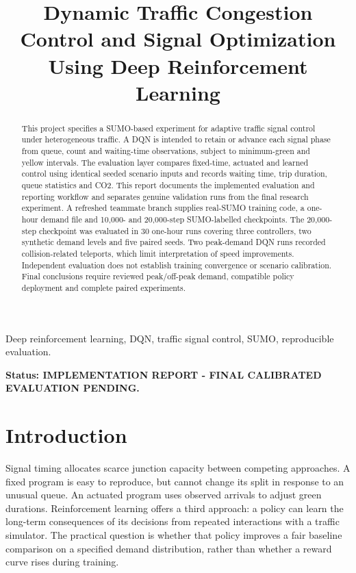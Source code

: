 \documentclass[conference]{IEEEtran}
\begin{document}
\title{Dynamic Traffic Congestion Control and Signal Optimization Using Deep Reinforcement Learning}
\author{}
\maketitle
\begin{abstract}This project specifies a SUMO-based experiment for adaptive traffic signal control under heterogeneous traffic. A DQN is intended to retain or advance each signal phase from queue, count and waiting-time observations, subject to minimum-green and yellow intervals. The evaluation layer compares fixed-time, actuated and learned control using identical seeded scenario inputs and records waiting time, trip duration, queue statistics and CO2. This report documents the implemented evaluation and reporting workflow and separates genuine validation runs from the final research experiment. A refreshed teammate branch supplies real-SUMO training code, a one-hour demand file and 10,000- and 20,000-step SUMO-labelled checkpoints. The 20,000-step checkpoint was evaluated in 30 one-hour runs covering three controllers, two synthetic demand levels and five paired seeds. Two peak-demand DQN runs recorded collision-related teleports, which limit interpretation of speed improvements. Independent evaluation does not establish training convergence or scenario calibration. Final conclusions require reviewed peak/off-peak demand, compatible policy deployment and complete paired experiments.\end{abstract}
\begin{IEEEkeywords}Deep reinforcement learning, DQN, traffic signal control, SUMO, reproducible evaluation.\end{IEEEkeywords}
\noindent\textbf{Status: IMPLEMENTATION REPORT - FINAL CALIBRATED EVALUATION PENDING.}
\section{Introduction}
Signal timing allocates scarce junction capacity between competing approaches. A fixed program is easy to reproduce, but cannot change its split in response to an unusual queue. An actuated program uses observed arrivals to adjust green durations. Reinforcement learning offers a third approach: a policy can learn the long-term consequences of its decisions from repeated interactions with a traffic simulator. The practical question is whether that policy improves a fair baseline comparison on a specified demand distribution, rather than whether a reward curve rises during training.
\end{document}
